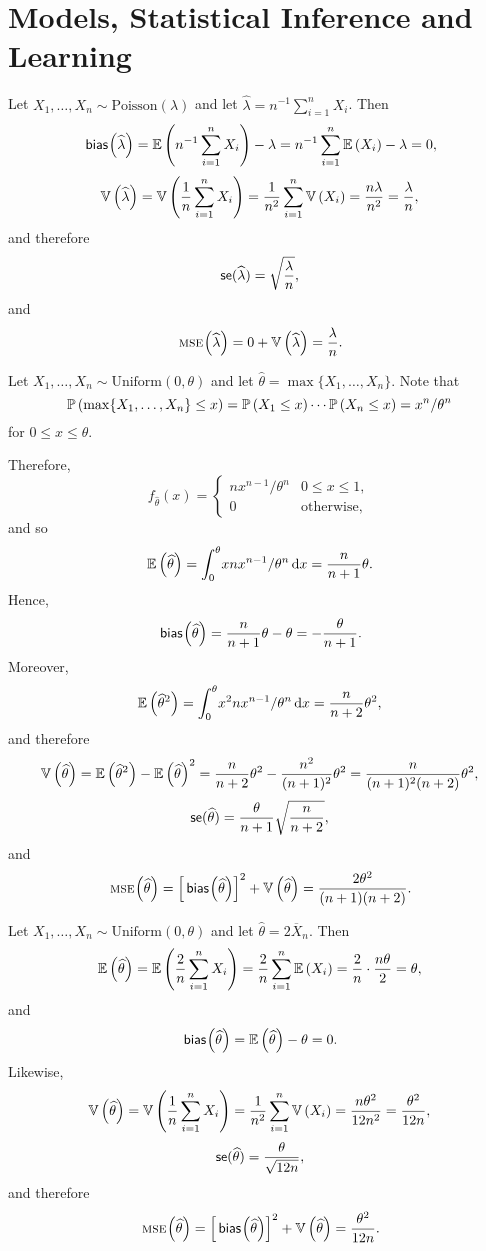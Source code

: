 \chapter{Models, Statistical Inference and Learning}

\begin{ex}
  Let $X_1,\ldots,X_n\sim\text{Poisson}(\lambda)$ and let
  $\widehat{\lambda}=n^{-1}\sum_{i=1}^nX_i$. Then
  \[
    \bias{\widehat{\lambda}}
    =\E{n^{-1}\sum_{i=1}^nX_i}-\lambda
    =n^{-1}\sum_{i=1}^n\E{X_i}-\lambda
    =0,
  \]
  \[
    \var{\widehat{\lambda}}
    =\var{\frac{1}{n}\sum_{i=1}^n X_i}
    =\frac{1}{n^2}\sum_{i=1}^n \var{X_i}
    =\frac{n\lambda}{n^2}=\frac{\lambda}{n},
  \]
  and therefore
  \[
    \se(\widehat{\lambda})
    =\sqrt{\frac{\lambda}{n}},
  \]
  and
  \[
    \mse{\widehat{\lambda}}=
    0+\var{\widehat{\lambda}}=\frac{\lambda}{n}.
  \]
\end{ex}

\begin{ex}
  Let $X_1,\ldots,X_n\sim\text{Uniform}(0,\theta)$ and let
  $\widehat{\theta} = \max\{X_1,\ldots, X_n\}$. Note that
  \[
    \P{\max\{X_1,\ldots,X_n\}\leq x}
    =\P{X_1\leq x}\cdots\P{X_n\leq x}
    =x^n/\theta^n
  \]
  for $0\leq x\leq\theta$.

  Therefore,
  \[
    f_{\widehat{\theta}}(x)
    =\begin{cases}
      nx^{n-1}/\theta^n & 0\leq x\leq 1,    \\
      0                 & \text{otherwise},
    \end{cases}
  \]
  and so
  \[
    \E{\widehat{\theta}}
    =\int_0^\theta\!xnx^{n-1}/\theta^n\,\d{x}
    =\frac{n}{n+1}\theta.
  \]
  Hence,
  \[
    \bias{\widehat{\theta}}
    =\frac{n}{n+1}\theta-\theta=-\frac{\theta}{n+1}.
  \]
  Moreover,
  \[
    \E{\widehat{\theta}^2}
    =\int_0^\theta\!x^2nx^{n-1}/\theta^n\,\d{x}
    =\frac{n}{n+2}\theta^2,
  \]
  and therefore
  \[
    \var{\widehat{\theta}}
    =\E{\widehat{\theta}^2}
    -\E{\widehat{\theta}}^2
    =\frac{n}{n+2}\theta^2
    -\frac{n^2}{(n+1)^2}\theta^2
    =\frac{n}{(n+1)^2(n+2)}\theta^2,
  \]
  \[
    \se(\widehat{\theta})
    =\frac{\theta}{n+1}\sqrt{\frac{n}{n+2}},
  \]
  and
  \[
    \mse{\widehat{\theta}}
    =\left[\bias{\widehat{\theta}}\right]^2+\var{\widehat{\theta}}
    =\frac{2\theta^2}{(n+1)(n+2)}.
  \]
\end{ex}

\begin{ex}
  Let $X_1,\ldots,X_n\sim\text{Uniform}(0,\theta)$ and let
  $\widehat{\theta} = 2\overline{X}_n$. Then
  \[
    \E{\widehat{\theta}}
    =\E{\frac{2}{n}\sum_{i=1}^n X_i}
    =\frac{2}{n}\sum_{i=1}^n \E{X_i}
    =\frac{2}{n}\cdot \frac{n\theta}{2}=\theta,
  \]
  and
  \[
    \bias{\widehat{\theta}}
    =\E{\widehat{\theta}}-\theta
    =0.
  \]
  Likewise,
  \[
    \var{\widehat{\theta}}
    =\var{\frac{1}{n}\sum_{i=1}^n X_i}
    =\frac{1}{n^2}\sum_{i=1}^n \var{X_i}
    =\frac{n\theta^2}{12n^2}
    =\frac{\theta^2}{12n},
  \]
  \[
    \se(\widehat{\theta})
    =\frac{\theta}{\sqrt{12 n}},
  \]
  and therefore
  \[
    \mse{\widehat{\theta}}
    =\left[\bias{\widehat{\theta}}\right]^2+\var{\widehat{\theta}}
    =\frac{\theta^2}{12n}.
  \]
\end{ex}